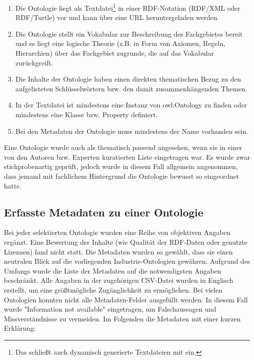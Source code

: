 \documentclass{article}
\begin{document}
\begin{enumerate}
    \item Die Ontologie liegt als Textdatei\footnote{Das schließt auch dynamisch generierte Textdateien mit ein.} in einer RDF-Notation (RDF/XML oder RDF/Turtle) vor und kann über eine URL heruntergeladen werden.
    \item Die Ontologie stellt ein Vokabular zur Beschreibung des Fachgebietes bereit und es liegt eine logische Theorie (z.B. in Form von Axiomen, Regeln, Hierarchien) über das Fachgebiet zugrunde, die auf das Vokabular zurückgreift.
    \item Die Inhalte der Ontologie haben einen direkten thematischen Bezug zu den aufgelisteten Schlüsselwörtern bzw. den damit zusammenhängenden Themen.
    \item In der Textdatei ist mindestens eine Instanz von owl:Ontology zu finden oder mindestens eine Klasse bzw. Property definiert.
    \item Bei den Metadaten der Ontologie muss mindestens der Name vorhanden sein.
\end{enumerate}

Eine Ontologie wurde auch als thematisch passend angesehen, wenn sie in einer von den Autoren bzw. Experten kuratierten Liste eingetragen war.
Es wurde zwar stichprobenartig geprüft, jedoch wurde in diesem Fall allgemein angenommen, dass jemand mit fachlichem Hintergrund die Ontologie bewusst so eingeordnet hatte.

\subsection{Erfasste Metadaten zu einer Ontologie}

Bei jeder selektierten Ontologie wurden eine Reihe von objektiven Angaben ergänzt.
Eine Bewertung der Inhalte (wie Qualität der RDF-Daten oder genutzte Lizenzen) fand nicht statt.
Die Metadaten wurden so gewählt, dass sie einen neutralen Blick auf die vorliegenden Industrie-Ontologien gewähren.
Aufgrund des Umfangs wurde die Liste der Metadaten auf die notwendigsten Angaben beschränkt.
Alle Angaben in der zugehörigen CSV-Datei wurden in Englisch erstellt, um eine größtmögliche Zugänglichkeit zu ermöglichen.
Bei vielen Ontologien konnten nicht alle Metadaten-Felder ausgefüllt werden.
In diesem Fall wurde "Information not available" eingetragen, um Falschaussagen und Missverständnisse zu vermeiden.
Im Folgenden die Metadaten mit einer kurzen Erklärung:
\end{document}
